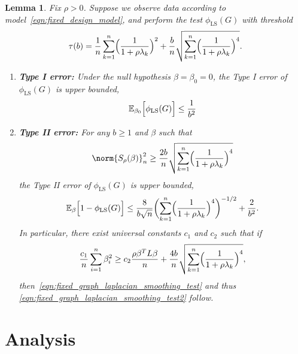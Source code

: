 \documentclass{article}
\newcommand{\1}{\mathbf{1}}
\newcommand{\Ebb}{\mathbb{E}}
\newcommand{\LS}{\mathrm{LS}}
\theoremstyle{alden}
\theoremstyle{aldenthm}
\newtheorem{lemma}{Lemma}
\theoremstyle{definition}
\theoremstyle{remark}
\begin{document}
\begin{lemma}
	\label{lem:fixed_graph_laplacian_smoothing_test}
	Fix $\rho > 0$. Suppose we observe data according to model~\eqref{eqn:fixed_design_model}, and perform the test $\phi_{\LS}(G)$ with threshold
	\begin{equation*}
	\tau(b) = \frac{1}{n} \sum_{k = 1}^{n} \Bigl(\frac{1}{1 + \rho \lambda_k}\Bigr)^2 + \frac{b}{n}\sqrt{\sum_{k = 1}^{n} \Bigl(\frac{1}{1 + \rho \lambda_k}\Bigr)^4}.
	\end{equation*}
	\begin{enumerate}
		\item \textbf{Type I error:} Under the null hypothesis $\beta = \beta_0 = 0$, the Type I error of $\phi_{\LS}(G)$ is upper bounded,
		\begin{equation*}
		\Ebb_{\beta_0}\Bigl[\phi_{\LS}(G)\Bigr] \leq \frac{1}{b^2}
		\end{equation*}
		\item \textbf{Type II error:} 
		For any $b \geq 1$ and $\beta$ such that
		\begin{equation}
		\label{eqn:fixed_graph_laplacian_smoothing_test}
		\norm{S_{\rho}(\beta)}_n^2 \geq \frac{2b}{n}\sqrt{\sum_{k = 1}^{n} \Bigl(\frac{1}{1 + \rho \lambda_k}\Bigr)^4}
		\end{equation}
		the Type II error of $\phi_{\LS}(G)$ is upper bounded,
		\begin{equation}
		\label{eqn:fixed_graph_laplacian_smoothing_test2}
		\Ebb_{\beta}\Bigl[1 - \phi_{\LS}(G)\Bigr] \leq \frac{8}{b\sqrt{n}}\biggl(\sum_{k = 1}^{n} \Bigl(\frac{1}{1 + \rho \lambda_k}\Bigr)^4\biggr)^{-1/2} + \frac{2}{b^2}.
		\end{equation}
		In particular, there exist universal constants $c_1$ and $c_2$ such that if
		\begin{equation}
		\label{eqn:fixed_graph_laplacian_smoothing_radius}
		\frac{c_1}{n}\sum_{i = 1}^{n} \beta_i^2 \geq c_2\frac{\rho\beta^T L \beta}{n} + \frac{4b}{n}\sqrt{\sum_{k = 1}^{n} \Bigl(\frac{1}{1 + \rho \lambda_k}\Bigr)^4},
		\end{equation}
		then~\eqref{eqn:fixed_graph_laplacian_smoothing_test} and thus \eqref{eqn:fixed_graph_laplacian_smoothing_test2} follow.
	\end{enumerate}
\end{lemma}

\section{Analysis}
\end{document}
